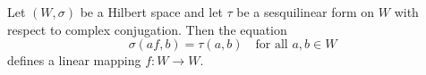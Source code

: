 Let $(W, \sigma)$ be a Hilbert space and let $\tau$ be a sesquilinear form on $W$ with respect to complex conjugation. Then the equation
$$
\sigma(a f, b) = \tau(a, b) \quad \text{for all } a, b \in W
$$
defines a linear mapping $f \colon W \to W$.
